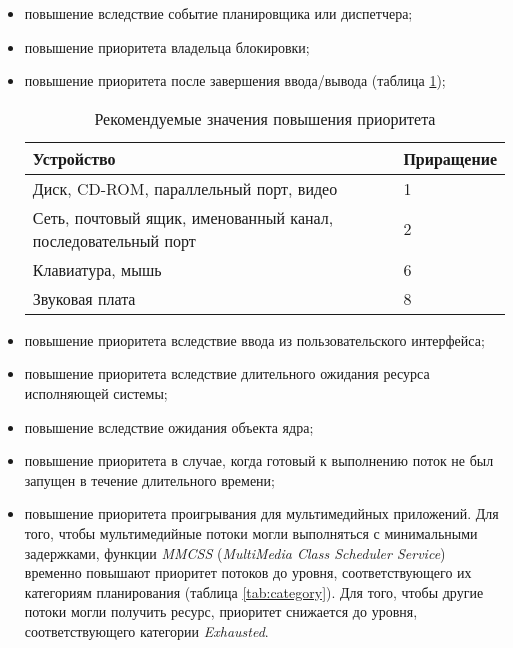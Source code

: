 \begin{itemize}
    \item повышение вследствие событие планировщика или диспетчера;
    \item повышение приоритета владельца блокировки;
    \item повышение приоритета после завершения ввода/вывода (таблица \ref{tab:input-output});
    
\begin{table}[h]
    \caption{Рекомендуемые значения повышения приоритета}
    \begin{center}
        \begin{tabular}{|p{100mm}|l|}
            \hline
            \textbf{Устройство} & \textbf{Приращение} \\\hline
            Диск, CD-ROM, параллельный порт, видео & 1 \\ \hline
            Сеть, почтовый ящик, именованный канал, последовательный порт & 2 \\ \hline
            Клавиатура, мышь & 6 \\ \hline
            Звуковая плата & 8 \\ \hline
        \end{tabular}
    \end{center}
    \label{tab:input-output}
\end{table}
    \item повышение приоритета вследствие ввода из пользовательского интерфейса;
    \item повышение приоритета вследствие длительного ожидания ресурса исполняющей системы;
    \item повышение вследствие ожидания объекта ядра;
    \item повышение приоритета в случае, когда готовый к выполнению поток не был запущен в течение длительного времени;
    \item повышение приоритета проигрывания для мультимедийных приложений. Для того, чтобы мультимедийные потоки могли выполняться с минимальными задержками, функции \textit{MMCSS} (\textit{MultiMedia Class Scheduler Service}) временно повышают приоритет потоков до уровня, соответствующего их категориям планирования (таблица \ref{tab:category}). Для того, чтобы другие потоки могли получить ресурс, приоритет снижается до уровня, соответствующего категории \textit{Exhausted}.
\end{itemize}

